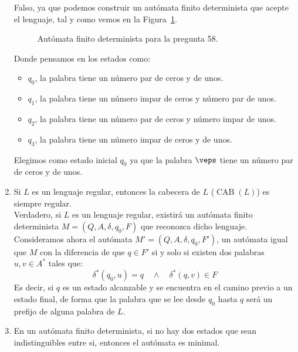 \begin{enumerate}
        Falso, ya que podemos construir un autómata finito determinista que acepte el lenguaje, tal y como vemos en la Figura~\ref{fig:tipo_test58}.
       \begin{figure}[H]
           \centering
           \caption{Autómata finito determinista para la pregunta 58.}
           \label{fig:tipo_test58}
       \end{figure}
       Donde pensamos en los estados como:
       \begin{itemize}
           \item $q_0$, la palabra tiene un número par de ceros y de unos.
           \item $q_1$, la palabra tiene un número impar de ceros y número par de unos.
           \item $q_2$, la palabra tiene un número par de ceros y número impar de unos.
           \item $q_3$, la palabra tiene un número impar de ceros y de unos.
       \end{itemize}
       Elegimos como estado inicial $q_0$ ya que la palabra $\veps$ tiene un número par de ceros y de unos.
    \item Si $L$ es un lenguaje regular, entonces la cabecera de $L$ ($\operatorname{CAB}(L)$) es siempre regular.\\

        Verdadero, si $L$ es un lenguaje regular, existirá un autómata finito determinista $M=(Q,A,\delta,q_0,F)$ que reconozca dicho lenguaje. Consideramos ahora el autómata $M'=(Q,A,\delta,q_0,F')$, un autómata igual que $M$ con la diferencia de que $q\in F'$ si y solo si existen dos palabras $u,v\in A^\ast$ tales que:
        \begin{equation*}
            \delta^\ast(q_0,u) = q \quad \land \quad \delta^\ast(q,v) \in F
        \end{equation*}
        Es decir, si $q$ es un estado alcanzable y se encuentra en el camino previo a un estado final, de forma que la palabra que se lee desde $q_0$ hasta $q$ será un prefijo de alguna palabra de $L$.
    \item En un autómata finito determinista, si no hay dos estados que sean indistinguibles entre si, entonces el autómata es minimal.\\


\end{enumerate}
